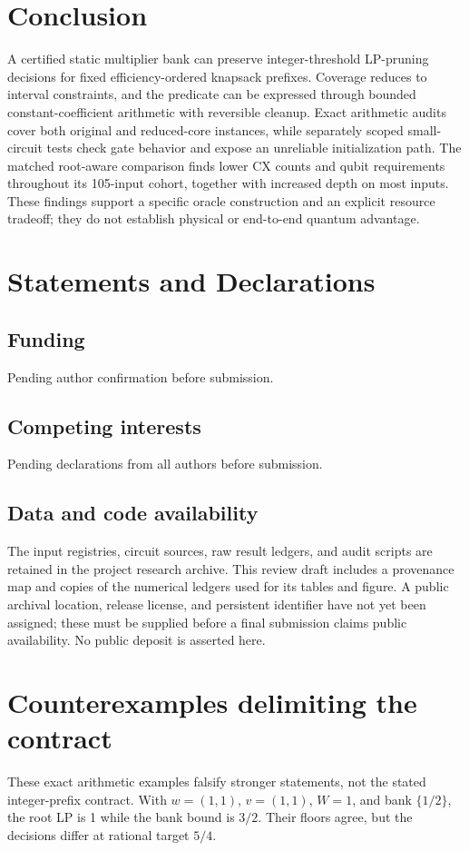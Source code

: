\documentclass[referee,pdflatex,sn-mathphys-num]{sn-jnl}
\theoremstyle{thmstyleone}
\theoremstyle{thmstyletwo}
\begin{document}
\section{Conclusion}
A certified static multiplier bank can preserve integer-threshold LP-pruning decisions for fixed efficiency-ordered knapsack prefixes. Coverage reduces to interval constraints, and the predicate can be expressed through bounded constant-coefficient arithmetic with reversible cleanup. Exact arithmetic audits cover both original and reduced-core instances, while separately scoped small-circuit tests check gate behavior and expose an unreliable initialization path. The matched root-aware comparison finds lower CX counts and qubit requirements throughout its 105-input cohort, together with increased depth on most inputs. These findings support a specific oracle construction and an explicit resource tradeoff; they do not establish physical or end-to-end quantum advantage.

\backmatter
\section*{Statements and Declarations}
\subsection*{Funding}
Pending author confirmation before submission.
\subsection*{Competing interests}
Pending declarations from all authors before submission.
\subsection*{Data and code availability}
The input registries, circuit sources, raw result ledgers, and audit scripts are retained in the project research archive. This review draft includes a provenance map and copies of the numerical ledgers used for its tables and figure. A public archival location, release license, and persistent identifier have not yet been assigned; these must be supplied before a final submission claims public availability. No public deposit is asserted here.

\appendix
\section{Counterexamples delimiting the contract}\label{app:counterexamples}
These exact arithmetic examples falsify stronger statements, not the stated integer-prefix contract. With $w=(1,1)$, $v=(1,1)$, $W=1$, and bank $\{1/2\}$, the root LP is 1 while the bank bound is $3/2$. Their floors agree, but the decisions differ at rational target $5/4$.
\end{document}
